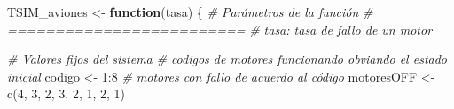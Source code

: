 \documentclass[
]{book}
\newenvironment{Shaded}{\begin{snugshade}}{\end{snugshade}}
\newcommand{\CommentTok}[1]{\textcolor[rgb]{0.56,0.35,0.01}{\textit{#1}}}
\newcommand{\ControlFlowTok}[1]{\textcolor[rgb]{0.13,0.29,0.53}{\textbf{#1}}}
\newcommand{\DecValTok}[1]{\textcolor[rgb]{0.00,0.00,0.81}{#1}}
\newcommand{\FunctionTok}[1]{\textcolor[rgb]{0.00,0.00,0.00}{#1}}
\newcommand{\NormalTok}[1]{#1}
\newcommand{\OtherTok}[1]{\textcolor[rgb]{0.56,0.35,0.01}{#1}}
\newcommand{\SpecialCharTok}[1]{\textcolor[rgb]{0.00,0.00,0.00}{#1}}
\theoremstyle{definition}
\theoremstyle{definition}
\theoremstyle{definition}
\theoremstyle{definition}
\theoremstyle{remark}
\begin{document}
\begin{Shaded}
\begin{Highlighting}[]
\NormalTok{TSIM\_aviones }\OtherTok{\textless{}{-}} \ControlFlowTok{function}\NormalTok{(tasa)}
\NormalTok{\{}
  \CommentTok{\# Parámetros de la función}
  \CommentTok{\# =========================}
  \CommentTok{\# tasa: tasa de fallo de un motor}
  
  \CommentTok{\# Valores fijos del sistema}
  \CommentTok{\# codigos de motores funcionando obviando el estado inicial}
\NormalTok{  codigo }\OtherTok{\textless{}{-}} \DecValTok{1}\SpecialCharTok{:}\DecValTok{8}
  \CommentTok{\# motores con fallo de acuerdo al código}
\NormalTok{  motoresOFF }\OtherTok{\textless{}{-}} \FunctionTok{c}\NormalTok{(}\DecValTok{4}\NormalTok{, }\DecValTok{3}\NormalTok{, }\DecValTok{2}\NormalTok{, }\DecValTok{3}\NormalTok{, }\DecValTok{2}\NormalTok{, }\DecValTok{1}\NormalTok{, }\DecValTok{2}\NormalTok{, }\DecValTok{1}\NormalTok{)}
  

\end{Highlighting}
\end{Shaded}
\end{document}
